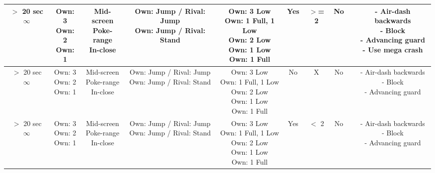\documentclass{article}
\begin{document}
\begin{landscape}
\begin{table}[h!]
\begin{center}
\begin{tabular*}{27cm}{c|c|c|c|c|c|c|c|c|c}
      \hline
      \makecell{$>$ 20 sec \\ $\infty$} & \makecell{Own: 3 \\ Own: 2 \\ Own: 1} & \makecell{Mid-screen \\ Poke-range \\ In-close} & \makecell{Own: Jump / Rival: Jump \\ Own: Jump / Rival: Stand} & \makecell{Own: 3 Low \\ Own: 1 Full, 1 Low \\ Own: 2 Low \\ Own: 1 Low \\ Own: 1 Full} & Yes & $>$= 2 & No & & \makecell{- Air-dash backwards \\ - Block \\ - Advancing guard \\ - Use mega crash}\\
      \hline
      \makecell{$>$ 20 sec \\ $\infty$} & \makecell{Own: 3 \\ Own: 2 \\ Own: 1} & \makecell{Mid-screen \\ Poke-range \\ In-close} & \makecell{Own: Jump / Rival: Jump \\ Own: Jump / Rival: Stand} & \makecell{Own: 3 Low \\ Own: 1 Full, 1 Low \\ Own: 2 Low \\ Own: 1 Low \\ Own: 1 Full} & No & X & No & & \makecell{- Air-dash backwards \\ - Block \\ - Advancing guard}\\
      \hline
      \makecell{$>$ 20 sec \\ $\infty$} & \makecell{Own: 3 \\ Own: 2 \\ Own: 1} & \makecell{Mid-screen \\ Poke-range \\ In-close} & \makecell{Own: Jump / Rival: Jump \\ Own: Jump / Rival: Stand} & \makecell{Own: 3 Low \\ Own: 1 Full, 1 Low \\ Own: 2 Low \\ Own: 1 Low \\ Own: 1 Full} & Yes & $<$ 2 & No & & \makecell{- Air-dash backwards \\ - Block \\ - Advancing guard}\\

\end{tabular*}
\end{center}
\end{table}
\end{landscape}
\end{document}
